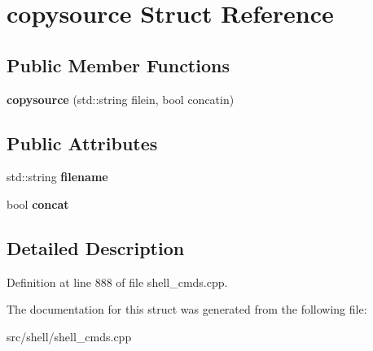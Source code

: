 \hypertarget{structcopysource}{\section{copysource Struct Reference}
\label{structcopysource}
}
\subsection*{Public Member Functions}
\begin{DoxyCompactItemize}
\item 
\hypertarget{structcopysource_a331ce01a5535122b9d07a69019377fef}{{\bfseries copysource} (std\-::string filein, bool concatin)}\label{structcopysource_a331ce01a5535122b9d07a69019377fef}

\end{DoxyCompactItemize}
\subsection*{Public Attributes}
\begin{DoxyCompactItemize}
\item 
\hypertarget{structcopysource_a53465278c86308205dd85bcb4277773d}{std\-::string {\bfseries filename}}\label{structcopysource_a53465278c86308205dd85bcb4277773d}

\item 
\hypertarget{structcopysource_afc69446550cf7febabeeba26122b0e84}{bool {\bfseries concat}}\label{structcopysource_afc69446550cf7febabeeba26122b0e84}

\end{DoxyCompactItemize}


\subsection{Detailed Description}


Definition at line 888 of file shell\-\_\-cmds.\-cpp.



The documentation for this struct was generated from the following file\-:\begin{DoxyCompactItemize}
\item 
src/shell/shell\-\_\-cmds.\-cpp\end{DoxyCompactItemize}
